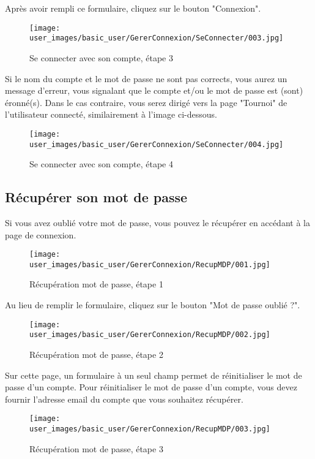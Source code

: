 Après avoir rempli ce formulaire, cliquez sur le bouton "Connexion".

\begin{figure}[H]
\centering
\texttt{[image: user\_images/basic\_user/GererConnexion/SeConnecter/003.jpg]}
\caption{Se connecter avec son compte, étape 3}
\end{figure}

Si le nom du compte et le mot de passe ne sont pas corrects, vous aurez un message d'erreur, vous signalant que le compte et/ou le mot de passe est (sont) éronné(s). Dans le cas contraire, vous serez dirigé vers la page "Tournoi" de l'utilisateur connecté, similairement à l'image ci-dessous.

\begin{figure}[H]
\centering
\texttt{[image: user\_images/basic\_user/GererConnexion/SeConnecter/004.jpg]}
\caption{Se connecter avec son compte, étape 4}
\end{figure}

\subsection{Récupérer son mot de passe}

Si vous avez oublié votre mot de passe, vous pouvez le récupérer en accédant à la page de connexion.

\begin{figure}[H]
\centering
\texttt{[image: user\_images/basic\_user/GererConnexion/RecupMDP/001.jpg]}
\caption{Récupération mot de passe, étape 1}
\end{figure}

Au lieu de remplir le formulaire, cliquez sur le bouton "Mot de passe oublié ?".

\begin{figure}[H]
\centering
\texttt{[image: user\_images/basic\_user/GererConnexion/RecupMDP/002.jpg]}
\caption{Récupération mot de passe, étape 2}
\end{figure}

Sur cette page, un formulaire à un seul champ permet de réinitialiser le mot de passe d'un compte. Pour réinitialiser le mot de passe d'un compte, vous devez fournir l'adresse email du compte que vous souhaitez récupérer.

\begin{figure}[H]
\centering
\texttt{[image: user\_images/basic\_user/GererConnexion/RecupMDP/003.jpg]}
\caption{Récupération mot de passe, étape 3}
\end{figure}

